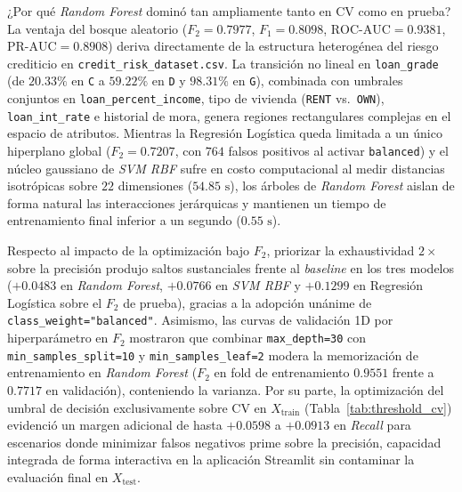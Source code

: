 \documentclass[conference]{IEEEtran}
\begin{document}
¿Por qué \textit{Random Forest} dominó tan ampliamente tanto en CV como en prueba? La ventaja del bosque aleatorio ($F_2=0.7977$, $F_1=0.8098$, $\text{ROC-AUC}=0.9381$, $\text{PR-AUC}=0.8908$) deriva directamente de la estructura heterogénea del riesgo crediticio en \texttt{credit\_risk\_dataset.csv}. La transición no lineal en \texttt{loan\_grade} (de $20.33\%$ en \texttt{C} a $59.22\%$ en \texttt{D} y $98.31\%$ en \texttt{G}), combinada con umbrales conjuntos en \texttt{loan\_percent\_income}, tipo de vivienda (\texttt{RENT} vs.\ \texttt{OWN}), \texttt{loan\_int\_rate} e historial de mora, genera regiones rectangulares complejas en el espacio de atributos. Mientras la Regresión Logística queda limitada a un único hiperplano global ($F_2=0.7207$, con $764$ falsos positivos al activar \texttt{balanced}) y el núcleo gaussiano de \textit{SVM RBF} sufre en costo computacional al medir distancias isotrópicas sobre $22$ dimensiones ($54.85\text{ s}$), los árboles de \textit{Random Forest} aislan de forma natural las interacciones jerárquicas y mantienen un tiempo de entrenamiento final inferior a un segundo ($0.55\text{ s}$).

Respecto al impacto de la optimización bajo $F_2$, priorizar la exhaustividad $2\times$ sobre la precisión produjo saltos sustanciales frente al \textit{baseline} en los tres modelos ($+0.0483$ en \textit{Random Forest}, $+0.0766$ en \textit{SVM RBF} y $+0.1299$ en Regresión Logística sobre el $F_2$ de prueba), gracias a la adopción unánime de \texttt{class\_weight="balanced"}. Asimismo, las curvas de validación 1D por hiperparámetro en $F_2$ mostraron que combinar \texttt{max\_depth=30} con \texttt{min\_samples\_split=10} y \texttt{min\_samples\_leaf=2} modera la memorización de entrenamiento en \textit{Random Forest} ($F_2$ en fold de entrenamiento $0.9551$ frente a $0.7717$ en validación), conteniendo la varianza. Por su parte, la optimización del umbral de decisión exclusivamente sobre CV en $X_{\text{train}}$ (Tabla~\ref{tab:threshold_cv}) evidenció un margen adicional de hasta $+0.0598$ a $+0.0913$ en \textit{Recall} para escenarios donde minimizar falsos negativos prime sobre la precisión, capacidad integrada de forma interactiva en la aplicación Streamlit sin contaminar la evaluación final en $X_{\text{test}}$.
\end{document}
